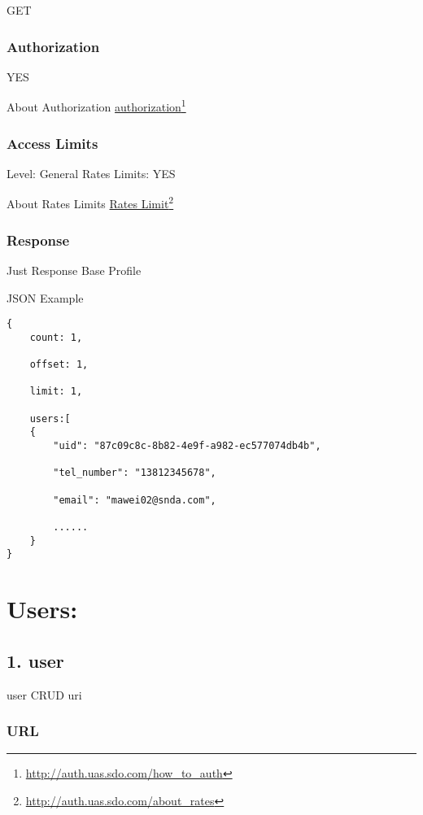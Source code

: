 GET

\section{Authorization}
\label{authorization}

YES

About Authorization \href{http://auth.uas.sdo.com/how_to_auth}{authorization}\footnote{\href{http://auth.uas.sdo.com/how_to_auth}{http:/\slash auth.uas.sdo.com\slash how\_to\_auth}}

\section{Access Limits}
\label{accesslimits}

Level: General
Rates Limits: YES

About Rates Limits \href{http://auth.uas.sdo.com/about_rates}{Rates Limit}\footnote{\href{http://auth.uas.sdo.com/about_rates}{http:/\slash auth.uas.sdo.com\slash about\_rates}}

\section{Response}
\label{response}

Just Response Base Profile 

JSON Example

\begin{verbatim}
{
    count: 1,

    offset: 1,

    limit: 1,

    users:[
    {
        "uid": "87c09c8c-8b82-4e9f-a982-ec577074db4b",

        "tel_number": "13812345678",

        "email": "mawei02@snda.com",

        ......
    }
}
\end{verbatim}


\part{Users:}
\label{users:}

\chapter{1. user}
\label{user}

user CRUD uri

\section{URL}
\label{url}

